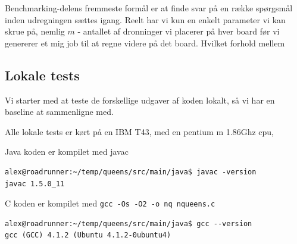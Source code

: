 Benchmarking-delens fremmeste formål er at finde svar på en række spørgsmål
inden udregningen sættes igang.  Reelt har vi kun en enkelt parameter vi kan
skrue på, nemlig $m$ - antallet af dronninger vi placerer på hver board før vi
genererer et mig job til at regne videre på det board.  Hvilket forhold mellem 


\subsection{Lokale tests}

Vi starter med at teste de forskellige udgaver af koden lokalt, så vi har en
baseline at sammenligne med.

Alle lokale tests er kørt på en IBM T43, med en pentium m 1.86Ghz cpu, 

Java koden er kompilet med javac

\begin{verbatim}
alex@roadrunner:~/temp/queens/src/main/java$ javac -version
javac 1.5.0_11
\end{verbatim}

C koden er kompilet med \texttt{gcc -Os -O2 -o nq nqueens.c}

\begin{verbatim}
alex@roadrunner:~/temp/queens/src/main/java$ gcc --version
gcc (GCC) 4.1.2 (Ubuntu 4.1.2-0ubuntu4)
\end{verbatim}

